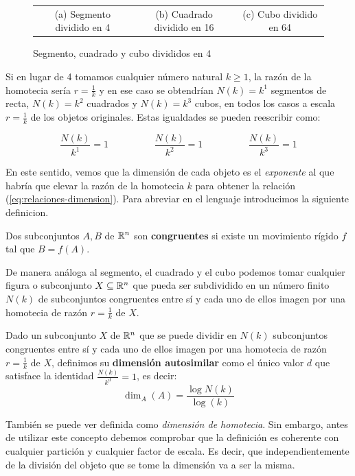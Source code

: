 \begin{figure}[h]
\begin{tabular}{ccc}
(a) Segmento dividido en 4 & (b) Cuadrado dividido en 16 & (c) Cubo dividido en 64 \\[4pt]
\end{tabular}
\caption{Segmento, cuadrado y cubo divididos en 4}
\label{fig:divisiones}
\end{figure}

Si en lugar de 4 tomamos cualquier número natural $k\geq 1$, la razón de la homotecia sería $r=\frac 1 k$ y en ese caso se obtendrían $N(k)=k^1$ segmentos de recta, $N(k)=k^2$ cuadrados y $N(k)=k^3$ cubos, en todos los casos a escala $r=\frac 1 k$ de los objetos originales. Estas igualdades se pueden reescribir como:

\begin{equation}\label{eq:relaciones-dimension}
\frac{N(k)}{k^1}=1 \hspace{2cm} \frac{N(k)}{k^2}=1 \hspace{2cm} \frac{N(k)}{k^3}=1
\end{equation}

En este sentido, vemos que la dimensión de cada objeto es el \textit{exponente} al que habría que elevar la razón de la homotecia $k$ para obtener la relación (\ref{eq:relaciones-dimension}). Para abreviar en el lenguaje introducimos la siguiente definicion.

\begin{definicion}[Congruencia]
Dos subconjuntos $A,B$ de $\mathbb{R}^n$ son \textbf{congruentes} si existe un movimiento rígido $f$ tal que $B = f(A)$.
\end{definicion}

De manera análoga al segmento, el cuadrado y el cubo podemos tomar cualquier figura o subconjunto $X\subseteq \mathbb{R}^n$ que pueda ser subdividido en un número finito $N(k)$ de subconjuntos congruentes entre sí y cada uno de ellos imagen por una homotecia de razón $r=\frac 1 k$ de $X$. 

\begin{definicion}
Dado un subconjunto $X$ de $\mathbb{R}^n$ que se puede dividir en $N(k)$ subconjuntos congruentes entre sí y cada uno de ellos imagen por una homotecia de razón $r=\frac 1 k$ de $X$, definimos su \textbf{dimensión autosimilar} como el único valor $d$ que satisface la identidad $\frac{N(k)}{k^d}=1$, es decir: 
$$
\dim_A(A)=\frac{\log N(k)}{\log(k)}
$$
\end{definicion}

También se puede ver definida como \textit{dimensión de homotecia}. Sin embargo, antes de utilizar este concepto debemos comprobar que la definición es coherente con cualquier partición y cualquier factor de escala. Es decir, que independientemente de la división del objeto que se tome la dimensión va a ser la misma.

